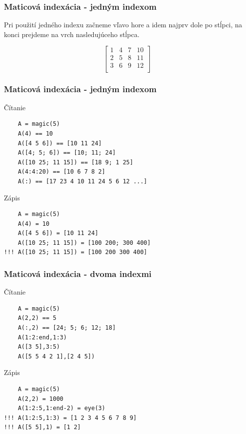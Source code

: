 \documentclass{beamer}
\begin{document}
\begin{frame}[fragile]
\frametitle{Maticová indexácia - jedným indexom}

  \centering
  
  Pri použití jedného indexu začneme vľavo hore a idem najprv dole po stĺpci, na konci prejdeme na vrch nasledujúceho stĺpca.
    
  $$\begin{bmatrix}
       1 & 4 & 7 & 10 \\[0.3em]
       2 & 5 & 8 & 11 \\[0.3em]
       3 & 6 & 9 & 12 \\[0.3em]
     \end{bmatrix} $$
\end{frame}

\begin{frame}[fragile]
\frametitle{Maticová indexácia - jedným indexom}    
  \begin{block}{Čítanie}
  \begin{verbatim}
    A = magic(5)
    A(4) == 10
    A([4 5 6]) == [10 11 24]
    A([4; 5; 6]) == [10; 11; 24]
    A([10 25; 11 15]) == [18 9; 1 25]
    A(4:4:20) == [10 6 7 8 2]
    A(:) == [17 23 4 10 11 24 5 6 12 ...]\end{verbatim}
  \end{block}
  
\begin{block}{Zápis}
  \begin{verbatim}
    A = magic(5)
    A(4) = 10
    A([4 5 6]) = [10 11 24]
    A([10 25; 11 15]) = [100 200; 300 400]
!!! A([10 25; 11 15]) = [100 200 300 400]\end{verbatim}
  \end{block}
\end{frame}

\begin{frame}[fragile]
\frametitle{Maticová indexácia - dvoma indexmi}    
  \begin{block}{Čítanie}
  \begin{verbatim}
    A = magic(5)
    A(2,2) == 5
    A(:,2) == [24; 5; 6; 12; 18]
    A(1:2:end,1:3)
    A([3 5],3:5)
    A([5 5 4 2 1],[2 4 5])\end{verbatim}
  \end{block}
  
\begin{block}{Zápis}
  \begin{verbatim}
    A = magic(5)
    A(2,2) = 1000
    A(1:2:5,1:end-2) = eye(3)
!!! A(1:2:5,1:3) = [1 2 3 4 5 6 7 8 9]
!!! A([5 5],1) = [1 2]\end{verbatim}
  \end{block}   
\end{frame}
\end{document}
